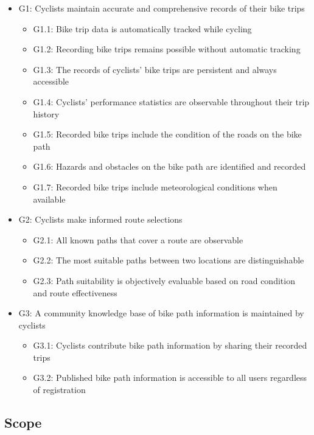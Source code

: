 \begin{itemize}
    \item G1: Cyclists maintain accurate and comprehensive records of their bike trips
    \begin{itemize}
        \item G1.1: Bike trip data is automatically tracked while cycling
        \item G1.2: Recording bike trips remains possible without automatic tracking
        \item G1.3: The records of cyclists' bike trips are persistent and always accessible
        \item G1.4: Cyclists' performance statistics are observable throughout their trip history
        \item G1.5: Recorded bike trips include the condition of the roads on the bike path
        \item G1.6: Hazards and obstacles on the bike path are identified and recorded
        \item G1.7: Recorded bike trips include meteorological conditions when available
    \end{itemize}
    \item G2: Cyclists make informed route selections
    \begin{itemize}
        \item G2.1: All known paths that cover a route are observable
        \item G2.2: The most suitable paths between two locations are distinguishable
        \item G2.3: Path suitability is objectively evaluable based on road condition and route effectiveness

    \end{itemize}
    \item G3: A community knowledge base of bike path information is maintained by cyclists
    \begin{itemize}
        \item G3.1: Cyclists contribute bike path information by sharing their recorded trips
        \item G3.2: Published bike path information is accessible to all users regardless of registration
    \end{itemize}
\end{itemize}

\subsection{Scope}

